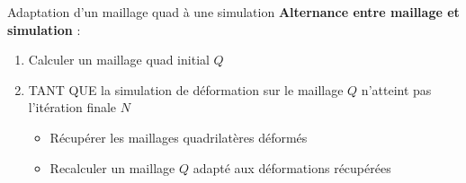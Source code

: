 \begin{frame}{Adaptation d'un maillage quad à une simulation}
    \textbf{Alternance entre maillage et simulation} :\\
    \begin{enumerate}
        \item Calculer un maillage quad initial \( Q \)
        \item TANT QUE la simulation de déformation sur le maillage \( Q \) n'atteint pas l'itération finale $N$
        \begin{itemize}
            \item Récupérer les maillages quadrilatères déformés
            \item Recalculer un maillage \( Q \) adapté aux déformations récupérées
        \end{itemize}
    \end{enumerate}
    
\end{frame}

